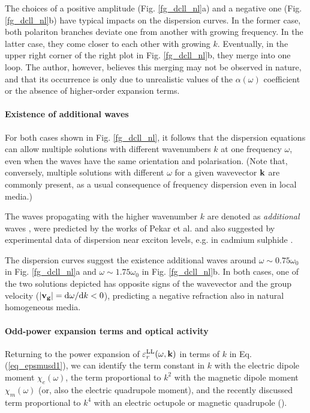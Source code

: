 The choices of a positive amplitude (Fig. \ref{fg_dcll_nl}a) and a negative one (Fig. \ref{fg_dcll_nl}b) have typical impacts on the dispersion curves. In the former case, both polariton branches deviate one from another with growing frequency. In the latter case, they come closer to each other with growing $k$. Eventually, in the upper right corner of the right plot in Fig. \ref{fg_dcll_nl}b, they merge into one loop. The author, however, believes this merging may not be observed in nature, and that its occurrence is only due to unrealistic values of the $\alpha(\omega)$ coefficient or the absence of higher-order expansion terms.

\paragraph{Existence of additional waves}   %
For both cases shown in Fig. \ref{fg_dcll_nl}, it follows that the dispersion equations can allow multiple solutions with different wavenumbers $k$ at one frequency $\omega$, even when the waves have the same orientation and polarisation. (Note that, conversely, multiple solutions with different $\omega$ for a given wavevector ${\mathbf{k}}$ are commonly present, as a usual consequence of frequency dispersion even in local media.)

The waves propagating with the higher wavenumber $k$ are denoted as \textit{additional} waves \cite{agranovich2006spatial, agranovich2004linear, krowne2007book, agranovich1962crystal}, were predicted by the works of Pekar et al. and also suggested by experimental data of dispersion near exciton levels, e.g. in cadmium sulphide \cite{pekar1975spatial}. 

The dispersion curves suggest the existence additional waves around $\omega \sim 0.75 \omega_0$ in  Fig. \ref{fg_dcll_nl}a and $\omega \sim 1.75 \omega_0$ in  Fig. \ref{fg_dcll_nl}b. In both cases, one of the two solutions depicted has opposite signs of the wavevector and the group velocity ($|{\mathbf{v_g}}| = \mathrm{d}\omega/\mathrm{d}k < 0$), predicting a negative refraction also in natural homogeneous media.

\paragraph{Odd-power expansion terms and optical activity }   %
Returning to the power expansion of $\varepsilon_r^\text{LL}(\omega, {\mathbf{k}})$ in terms of $k$ in Eq. (\ref{eq_epsmusd1}), we can identify the term constant in $k$ with the electric dipole moment $\chi_e(\omega)$, the term proportional to $k^2$ with the magnetic dipole moment $\chi_m(\omega)$ (or, also the electric quadrupole moment), and the recently discussed term proportional to $k^4$ with an electric octupole or magnetic quadrupole (\cite{agranovich2006spatial, agranovich2004linear, krowne2007book}).

